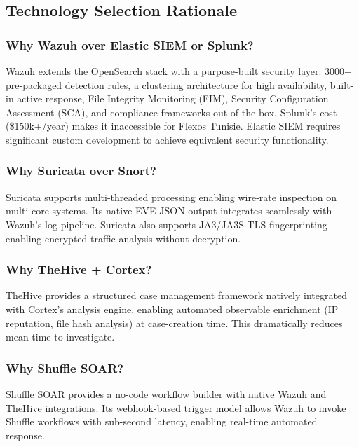 \documentclass[12pt,a4paper]{report}
\begin{document}
\subsection{Technology Selection Rationale}

\subsubsection{Why Wazuh over Elastic SIEM or Splunk?}

Wazuh extends the OpenSearch stack with a purpose-built security layer: 3000+ pre-packaged detection rules, a clustering architecture for high availability, built-in active response, File Integrity Monitoring (FIM), Security Configuration Assessment (SCA), and compliance frameworks out of the box. Splunk's cost (\$150k+/year) makes it inaccessible for Flexos Tunisie. Elastic SIEM requires significant custom development to achieve equivalent security functionality.

\subsubsection{Why Suricata over Snort?}

Suricata supports multi-threaded processing enabling wire-rate inspection on multi-core systems. Its native EVE JSON output integrates seamlessly with Wazuh's log pipeline. Suricata also supports JA3/JA3S TLS fingerprinting---enabling encrypted traffic analysis without decryption.

\subsubsection{Why TheHive + Cortex?}

TheHive provides a structured case management framework natively integrated with Cortex's analysis engine, enabling automated observable enrichment (IP reputation, file hash analysis) at case-creation time. This dramatically reduces mean time to investigate.

\subsubsection{Why Shuffle SOAR?}

Shuffle SOAR provides a no-code workflow builder with native Wazuh and TheHive integrations. Its webhook-based trigger model allows Wazuh to invoke Shuffle workflows with sub-second latency, enabling real-time automated response.
\end{document}
